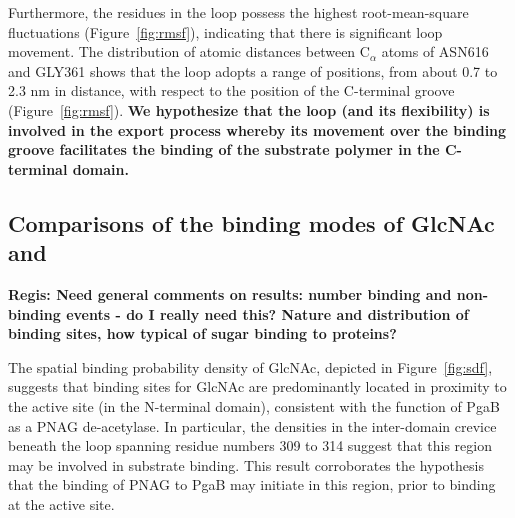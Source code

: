 Furthermore, the residues in the loop possess the highest root-mean-square fluctuations (Figure~\ref{fig:rmsf}), indicating that there is significant loop movement. The distribution of atomic distances between C$_\alpha$ atoms of ASN616 and GLY361 shows that the loop adopts a range of positions, from about 0.7 to 2.3 nm in distance, with respect to the position of the C-terminal groove (Figure~\ref{fig:rmsf}). \textbf{We hypothesize that the loop (and its flexibility) is involved in the export process whereby its movement over the binding groove facilitates the binding of the substrate polymer in the C-terminal domain.}

\subsection{Comparisons of the binding modes of GlcNAc and \glucosamine}
\textbf{Regis: Need general comments on results: number binding and non-binding events - do I really need this? Nature and distribution of binding sites, how typical of sugar binding to proteins?}

The spatial binding probability density of GlcNAc, depicted in Figure~\ref{fig:sdf}, suggests that binding sites for GlcNAc are predominantly located in proximity to the active site (in the N-terminal domain), consistent with the function of PgaB as a PNAG de-acetylase. In particular, the densities in the inter-domain crevice beneath the loop spanning residue numbers 309 to 314 suggest that this region may be involved in substrate binding. This result corroborates the hypothesis that the binding of PNAG to PgaB may initiate in this region, prior to binding at the active site.\cite{Little:2012dp} 

